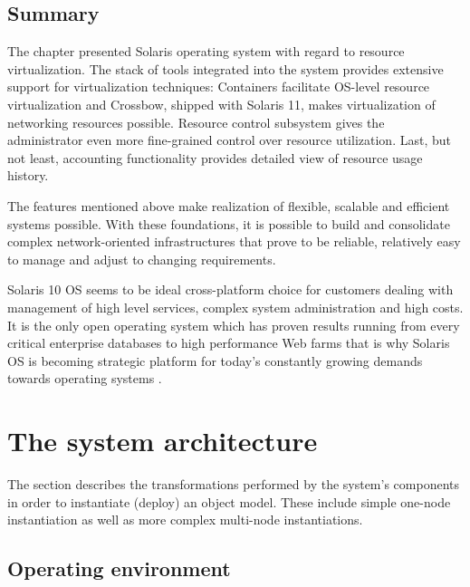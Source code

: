 \documentclass[11pt]{book}
\begin{document}
                

    \section*{Summary}

      The chapter presented Solaris operating system with regard to resource virtualization. The stack of tools
      integrated into the system provides extensive support for virtualization techniques: Containers facilitate
      OS-level resource virtualization and Crossbow, shipped with Solaris 11, makes virtualization of networking
      resources possible. Resource control subsystem gives the administrator even more fine-grained control over
      resource utilization. Last, but not least, accounting functionality provides detailed view of resource usage
      history.

      The features mentioned above make realization of flexible, scalable and efficient systems possible. With these
      foundations, it is possible to build and consolidate complex network-oriented infrastructures that prove to be
      reliable, relatively easy to manage and adjust to changing requirements.

      Solaris 10 OS seems to be ideal cross-platform choice for customers dealing with management of high level
      services, complex system administration and high costs. It is the only open operating system which has proven
      results running from every critical enterprise databases to high performance Web farms that is why Solaris OS is
      becoming strategic platform for today's constantly growing demands towards operating systems \cite{solaris_operating_system}. 


  \chapter{The system architecture}

    The  section describes the transformations performed by the system's components in order
    to instantiate (deploy) an object model. These include simple one-node instantiation as well as more complex
    multi-node instantiations.



    \section{Operating environment}
    
\end{document}

